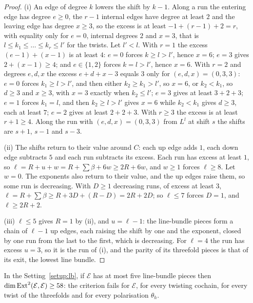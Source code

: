 \begin{proof}
(i) An edge of degree $k$ lowers the shift by $k-1$. Along a run the entering edge has degree $e\ge0$, the $r-1$ internal edges have degree at least $2$ and the leaving edge has degree $x\ge3$, so the excess is at least $-1+(r-1)+2=r$, with equality only for $e=0$, internal degrees $2$ and $x=3$, that is $l\le k_{1}\le\dots\le k_{r}\le l'$ for the twists. Let $l'<l$. With $r=1$ the excess $(e-1)+(x-1)$ is at least $4$: $e=0$ forces $k\ge l>l'$, hence $x=6$; $e=3$ gives $2+(x-1)\ge4$; and $e\in\{1,2\}$ forces $k=l>l'$, hence $x=6$. With $r=2$ and degrees $e,d,x$ the excess $e+d+x-3$ equals $3$ only for $(e,d,x)=(0,3,3)$: $e=0$ forces $k_{1}\ge l>l'$, and then either $k_{2}\ge k_{1}>l'$, so $x=6$, or $k_{2}<k_{1}$, so $d\ge3$ and $x\ge3$, with $x=3$ exactly when $k_{2}\le l'$; $e=3$ gives at least $3+2+3$; $e=1$ forces $k_{1}=l$, and then $k_{2}\ge l>l'$ gives $x=6$ while $k_{2}<k_{1}$ gives $d\ge3$, each at least $7$; $e=2$ gives at least $2+2+3$. With $r\ge3$ the excess is at least $r+1\ge4$. Along the run with $(e,d,x)=(0,3,3)$ from $L^{l}$ at shift $s$ the shifts are $s+1$, $s-1$ and $s-3$.

(ii) The shifts return to their value around $C$: each up edge adds $1$, each down edge subtracts $5$ and each run subtracts its excess. Each run has excess at least $1$, so $\ell=R+u+w=R+\sum\beta+6w\ge2R+6w$, and $w\ge1$ forces $\ell\ge8$. Let $w=0$. The exponents also return to their value, and the up edges raise them, so some run is decreasing. With $D\ge1$ decreasing runs, of excess at least $3$, $\ell=R+\sum\beta\ge R+3D+(R-D)=2R+2D$; so $\ell\le7$ forces $D=1$, and $\ell\ge2R+2$.

(iii) $\ell\le5$ gives $R=1$ by (ii), and $u=\ell-1$: the line-bundle pieces form a chain of $\ell-1$ up edges, each raising the shift by one and the exponent, closed by one run from the last to the first, which is decreasing. For $\ell=4$ the run has excess $u=3$, so it is the run of (i), and the parity of its threefold pieces is that of its exit, the lowest line bundle.
\end{proof}

\begin{theorem}\label{thm:fivebundles}
In the Setting~\ref{setup:lb}, if $\mathcal{E}$ has at most five line-bundle pieces then $\dim\mathrm{Ext}^{2}(\mathcal{E},\mathcal{E})\ge58$: the criterion fails for $\mathcal{E}$, for every twisting cochain, for every twist of the threefolds and for every polarisation $\theta_{h}$.
\end{theorem}

